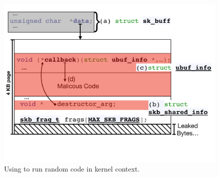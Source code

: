 \begin{figure}[t]
    \centering
    \includegraphics[width=\linewidth]{figs/ubuf.pdf}
    \caption{Using \shinfo to run random code in kernel context.}
    \label{fig:sh_info}
\end{figure}
